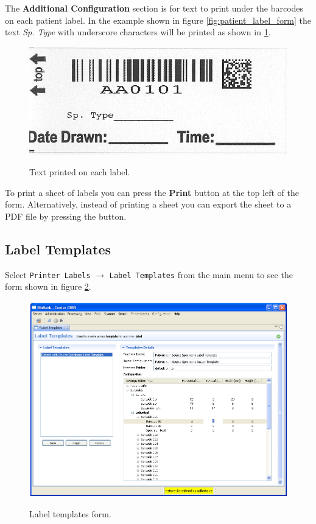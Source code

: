 The \textbf{Additional Configuration} section is for text to print under the
barcodes on each patient label. In the example shown in figure
\ref{fig:patient_label_form} the text \emph{Sp. Type} with underscore
characters will be printed as shown in \ref{fig:sp_type_single_label}.

\begin{figure}[H]
  \centering
  \scalebox{1.0}
	   { \includegraphics*{screenshots/printer_labels/05_single_label} }
	   \caption{Text printed on each label.}
	   \label{fig:sp_type_single_label}
\end{figure}

To print a sheet of labels you can press the \textbf{Print} button at the top
left of the form. Alternatively, instead of printing a sheet you can export the
sheet to a PDF file by pressing the  button.

\subsection{Label Templates}
\label{sec:label_templates}

Select \texttt{Printer Labels} $\to$ \texttt{Label Templates} from the main
menu to see the form shown in figure \ref{fig:label_templates_form}.

\begin{figure}[H]
  \centering
  \scalebox{0.45}
	   { \includegraphics*{screenshots/printer_labels/06_label_templates_form} }
	   \caption{Label templates form.}
	   \label{fig:label_templates_form}
\end{figure}

